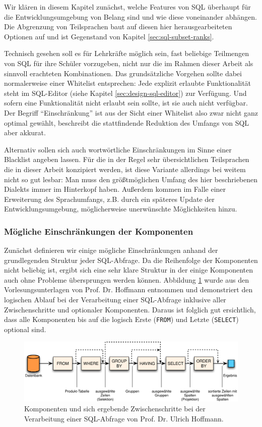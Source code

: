 Wir klären in diesem Kapitel zunächst, welche Features von SQL überhaupt für die Entwicklungsumgebung von Belang sind und wie diese voneinander abhängen. Die Abgrenzung von Teilsprachen baut auf diesen hier herausgearbeiteten Optionen auf und ist Gegenstand von Kapitel \ref{sec:sql-subset-ranks}.

Technisch gesehen soll es für Lehrkräfte möglich sein, fast beliebige Teilmengen von SQL für ihre Schüler vorzugeben, nicht nur die im Rahmen dieser Arbeit als sinnvoll erachteten Kombinationen. Das grundsätzliche Vorgehen sollte dabei normalerweise einer Whitelist entsprechen: Jede explizit erlaubte Funktionalität steht im SQL-Editor (siehe Kapitel \ref{sec:design-sql-editor}) zur Verfügung. Und sofern eine Funktionalität nicht erlaubt sein sollte, ist sie auch nicht verfügbar. Der Begriff ``Einschränkung'' ist aus der Sicht einer Whitelist also zwar nicht ganz optimal gewählt, beschreibt die stattfindende Reduktion des Umfangs von SQL aber akkurat.

Alternativ sollen sich auch wortwörtliche Einschränkungen im Sinne einer Blacklist angeben lassen. Für die in der Regel sehr übersichtlichen Teilsprachen die in dieser Arbeit konzipiert werden, ist diese Variante allerdings bei weitem nicht so gut lesbar: Man muss den größtmöglichen Umfang des hier beschriebenen Dialekts immer im Hinterkopf haben. Außerdem kommen im Falle einer Erweiterung des Sprachumfangs, z.B. durch ein späteres Update der Entwicklungsumgebung, möglicherweise unerwünschte Möglichkeiten hinzu.

\subsubsection{Mögliche Einschränkungen der Komponenten}
\label{sec:sql-subset-local}

Zunächst definieren wir einige mögliche Einschränkungen anhand der grundlegenden Struktur jeder SQL-Abfrage. Da die Reihenfolge der Komponenten nicht beliebig ist, ergibt sich eine sehr klare Struktur in der einige Komponenten auch ohne Probleme übersprungen werden können. Abbildung \ref{fig:sql-steps} wurde aus den Vorlesungsunterlagen von Prof. Dr. Hoffmann entnommen und demonstriert den logischen Ablauf bei der Verarbeitung einer SQL-Abfrage inklusive aller Zwischenschritte und optionaler Komponenten. Daraus ist folglich gut ersichtlich, dass alle Komponenten bis auf die logisch Erste (\texttt{FROM}) und Letzte (\texttt{SELECT}) optional sind.

\begin{figure}
  \centering \includegraphics{images/sql-steps.png}
  \caption{Komponenten und sich ergebende Zwischenschritte bei der Verarbeitung einer SQL-Abfrage von Prof. Dr. Ulrich Hoffmann.}
  \label{fig:sql-steps}
\end{figure}

